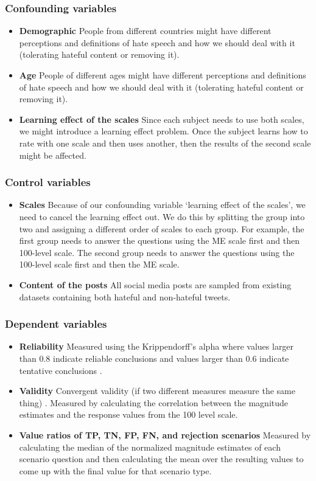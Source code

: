 \documentclass[a4paper]{article}
\begin{document}
\subsubsection{Confounding variables}
\begin{itemize}
    \item \textbf{Demographic} People from different countries might have different perceptions and definitions of hate speech and how we should deal with it (tolerating hateful content or removing it).
    \item \textbf{Age} People of different ages might have different perceptions and definitions of hate speech and how we should deal with it (tolerating hateful content or removing it).
    \item \textbf{Learning effect of the scales} Since each subject needs to use both scales, we might introduce a learning effect problem. Once the subject learns how to rate with one scale and then uses another, then the results of the second scale might be affected.
\end{itemize}

\subsubsection{Control variables}
\begin{itemize}
    \item \textbf{Scales} Because of our confounding variable ‘learning effect of the scales', we need to cancel the learning effect out. We do this by splitting the group into two and assigning a different order of scales to each group. For example, the first group needs to answer the questions using the ME scale first and then 100-level scale. The second group needs to answer the questions using the 100-level scale first and then the ME scale.
    \item \textbf{Content of the posts} All social media posts are sampled from existing datasets containing both hateful and non-hateful tweets.
\end{itemize}

\subsubsection{Dependent variables}
\begin{itemize}
    \item \textbf{Reliability} Measured using the Krippendorff's alpha where values larger than 0.8 indicate reliable conclusions and values larger than 0.6 indicate tentative conclusions \cite{krippendorff2004reliability}.
    \item \textbf{Validity} Convergent validity (if two different measures measure the same thing) \cite{fitzner2007reliability}. Measured by calculating the correlation between the magnitude estimates and the response values from the 100 level scale.
    \item \textbf{Value ratios of TP, TN, FP, FN, and rejection scenarios} Measured by calculating the median of the normalized magnitude estimates of each scenario question and then calculating the mean over the resulting values to come up with the final value for that scenario type.
\end{itemize}
\end{document}
